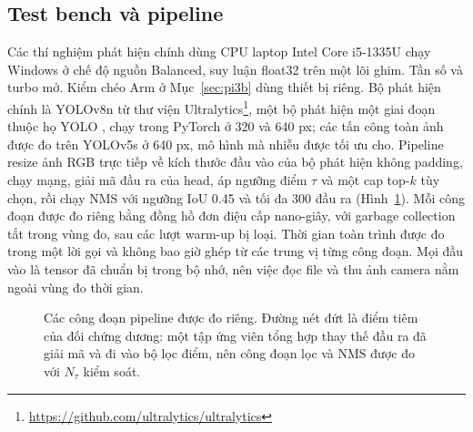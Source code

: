\documentclass[a4paper,fleqn]{cas-dc}
\newcommand{\Ntau}{N_{\tau}}
\begin{document}
\subsection{Test bench và pipeline}
Các thí nghiệm phát hiện chính dùng CPU laptop Intel Core i5-1335U chạy Windows ở chế độ nguồn Balanced, suy luận float32 trên một lõi ghim. Tần số và turbo mở. Kiểm chéo Arm ở Mục~\ref{sec:pi3b} dùng thiết bị riêng. Bộ phát hiện chính là YOLOv8n từ thư viện Ultralytics\footnote{\url{https://github.com/ultralytics/ultralytics}}, một bộ phát hiện một giai đoạn thuộc họ YOLO \cite{redmon2016yolo}, chạy trong PyTorch \cite{paszke2019pytorch} ở 320 và 640 px; các tấn công toàn ảnh được đo trên YOLOv5s ở 640 px, mô hình mà nhiễu được tối ưu cho. Pipeline resize ảnh RGB trực tiếp về kích thước đầu vào của bộ phát hiện không padding, chạy mạng, giải mã đầu ra của head, áp ngưỡng điểm $\tau$ và một cap top-$k$ tùy chọn, rồi chạy NMS với ngưỡng IoU 0.45 và tối đa 300 đầu ra (Hình~\ref{fig:pipeline}). Mỗi công đoạn được đo riêng bằng đồng hồ đơn điệu cấp nano-giây, với garbage collection tắt trong vùng đo, sau các lượt warm-up bị loại. Thời gian toàn trình được đo trong một lời gọi và không bao giờ ghép từ các trung vị từng công đoạn. Mọi đầu vào là tensor đã chuẩn bị trong bộ nhớ, nên việc đọc file và thu ảnh camera nằm ngoài vùng đo thời gian.

\begin{figure}[pos=!t]
\centering
{}
\caption{Các công đoạn pipeline được đo riêng. Đường nét đứt là điểm tiêm của đối chứng dương: một tập ứng viên tổng hợp thay thế đầu ra đã giải mã và đi vào bộ lọc điểm, nên công đoạn lọc và NMS được đo với $\Ntau$ kiểm soát.}
\label{fig:pipeline}
\end{figure}
\end{document}
